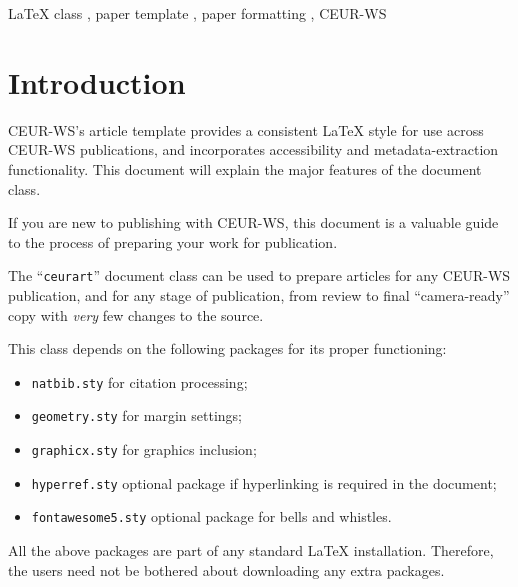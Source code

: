 \documentclass[
 twocolumn,
 hf,
]{ceurart}
\begin{document}
\begin{keywords}
  LaTeX class \sep
  paper template \sep
  paper formatting \sep
  CEUR-WS
\end{keywords}

\maketitle

\section{Introduction}

CEUR-WS's article template provides a consistent \LaTeX{} style for
use across CEUR-WS publications, and incorporates accessibility and
metadata-extraction functionality. This document will explain the
major features of the document class.

If you are new to publishing with CEUR-WS, this document is a valuable
guide to the process of preparing your work for publication.

The ``\verb|ceurart|'' document class can be used to prepare articles
for any CEUR-WS publication, and for any stage of publication, from
review to final ``camera-ready'' copy with {\itshape very} few changes
to the source.

This class depends on the following packages
for its proper functioning:

\begin{itemize}
\item \verb|natbib.sty| for citation processing;
\item \verb|geometry.sty| for margin settings;
\item \verb|graphicx.sty| for graphics inclusion;
\item \verb|hyperref.sty| optional package if hyperlinking is required in
  the document;
\item \verb|fontawesome5.sty| optional package for bells and whistles.
\end{itemize}

All the above packages are part of any
standard \LaTeX{} installation.
Therefore, the users need not be
bothered about downloading any extra packages.
\end{document}
